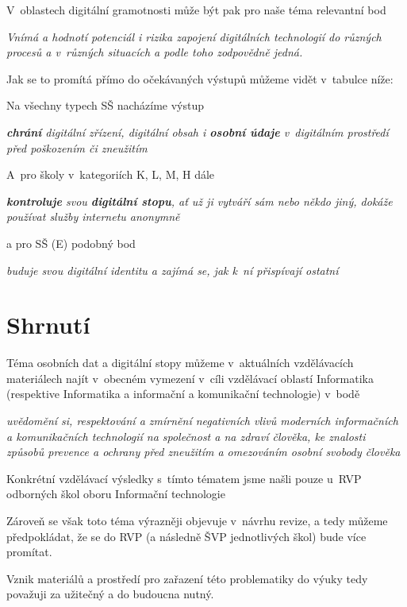 V~oblastech digitální gramotnosti může být pak pro naše téma relevantní bod

\textit{Vnímá a hodnotí potenciál i rizika zapojení digitálních technologií do různých procesů a v různých situacích a podle toho zodpovědně jedná.}

Jak se to promítá přímo do očekávaných výstupů můžeme vidět v~tabulce níže:


Na všechny typech SŠ nacházíme výstup

\textit{\textbf{chrání} digitální zřízení, digitální obsah i \textbf{osobní údaje} v~digitálním prostředí před poškozením či zneužitím}

A~pro školy v~kategoriích K, L, M, H dále

\textit{\textbf{kontroluje} svou \textbf{digitální stopu}, ať už ji vytváří sám nebo někdo jiný, dokáže používat služby internetu anonymně}

a pro SŠ (E) podobný bod

\textit{buduje svou digitální identitu a zajímá se, jak k~ní přispívají ostatní}

\section{Shrnutí}

Téma osobních dat a digitální stopy můžeme v~aktuálních vzdělávacích materiálech najít v~obecném vymezení v~cíli vzdělávací oblastí Informatika (respektive Informatika a informační a komunikační technologie) v~bodě

\textit{uvědomění si, respektování a zmírnění negativních vlivů moderních informačních a komunikačních technologií na společnost a na zdraví člověka, ke znalosti způsobů prevence a ochrany před zneužitím a omezováním osobní svobody člověka}

Konkrétní vzdělávací výsledky s~tímto tématem jsme našli pouze u~RVP odborných škol oboru Informační technologie

Zároveň se však toto téma výrazněji objevuje v~návrhu revize, a tedy můžeme předpokládat, že se do RVP (a následně ŠVP jednotlivých škol) bude více promítat.

Vznik materiálů a prostředí pro zařazení této problematiky do výuky tedy považuji za užitečný a do budoucna nutný.